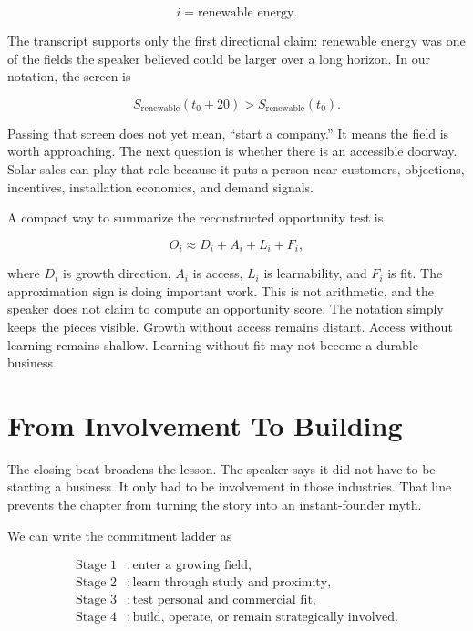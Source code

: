 \begin{equation}
i = \text{renewable energy}.
\end{equation}

The transcript supports only the first directional claim: renewable energy was one of the fields the speaker believed could be larger over a long horizon. In our notation, the screen is

\begin{equation}
S_{\mathrm{renewable}}(t_0+20)
>
S_{\mathrm{renewable}}(t_0).
\end{equation}

Passing that screen does not yet mean, ``start a company.'' It means the field is worth approaching. The next question is whether there is an accessible doorway. Solar sales can play that role because it puts a person near customers, objections, incentives, installation economics, and demand signals.

A compact way to summarize the reconstructed opportunity test is

\begin{equation}
O_i
\approx
D_i + A_i + L_i + F_i,
\end{equation}

where \(D_i\) is growth direction, \(A_i\) is access, \(L_i\) is learnability, and \(F_i\) is fit. The approximation sign is doing important work. This is not arithmetic, and the speaker does not claim to compute an opportunity score. The notation simply keeps the pieces visible. Growth without access remains distant. Access without learning remains shallow. Learning without fit may not become a durable business.

\section{From Involvement To Building}

The closing beat broadens the lesson. The speaker says it did not have to be starting a business. It only had to be involvement in those industries. That line prevents the chapter from turning the story into an instant-founder myth.

We can write the commitment ladder as

\begin{align}
\text{Stage 1} &: \text{enter a growing field},\\
\text{Stage 2} &: \text{learn through study and proximity},\\
\text{Stage 3} &: \text{test personal and commercial fit},\\
\text{Stage 4} &: \text{build, operate, or remain strategically involved}.
\end{align}

